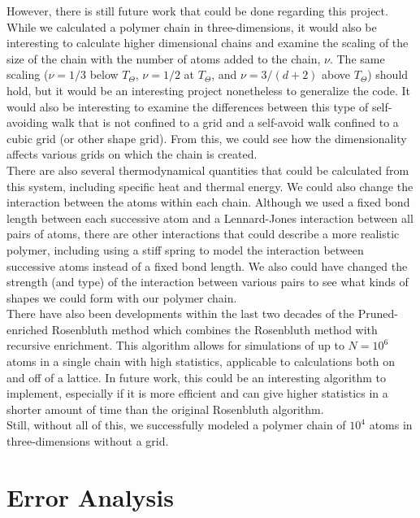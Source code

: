\documentclass{article}
\begin{document}
\begin{multicols}{2}
However, there is still future work that could be done regarding this project.  While we calculated a polymer chain in three-dimensions, it would also be interesting to calculate higher dimensional chains and examine the scaling of the size of the chain with the number of atoms added to the chain, $\nu$.  The same scaling ($\nu = 1/3$ below $T_\Theta$, $\nu = 1/2$ at $T_\Theta$, and $\nu = 3/(d+2)$ above $T_\Theta$) should hold, but it would be an interesting project nonetheless to generalize the code.  It would also be interesting to examine the differences between this type of self-avoiding walk that is not confined to a grid and a self-avoid walk confined to a cubic grid (or other shape grid).  From this, we could see how the dimensionality affects various grids on which the chain is created.  \\

There are also several thermodynamical quantities that could be calculated from this system, including specific heat and thermal energy.  We could also change the interaction between the atoms within each chain.  Although we used a fixed bond length between each successive atom and a Lennard-Jones interaction between all pairs of atoms, there are other interactions that could describe a more realistic polymer, including using a stiff spring to model the interaction between successive atoms instead of a fixed bond length.  We also could have changed the strength (and type) of the interaction between various pairs to see what kinds of shapes we could form with our polymer chain.  \\

There have also been developments within the last two decades of the Pruned-enriched Rosenbluth method which combines the Rosenbluth method with recursive enrichment.  This algorithm allows for simulations of up to $N=10^6$ atoms in a single chain with high statistics, applicable to calculations both on and off of a lattice.  \cite{PERM}  In future work, this could be an interesting algorithm to implement, especially if it is more efficient and can give higher statistics in a shorter amount of time than the original Rosenbluth algorithm.  \\

Still, without all of this, we successfully modeled a polymer chain of $10^4$ atoms in three-dimensions without a grid.  \\

\appendix

\section{Error Analysis}


\end{multicols}
\end{document}

